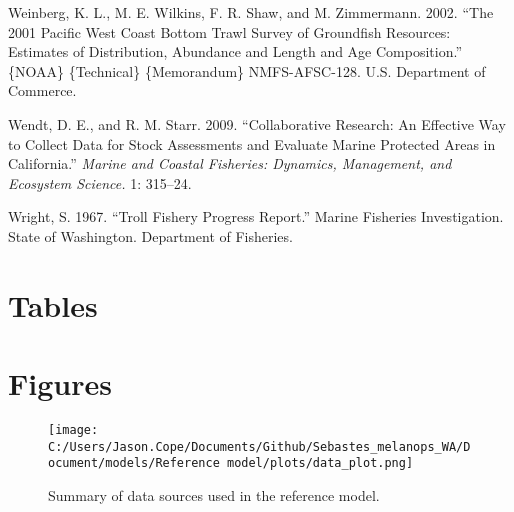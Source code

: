 \documentclass[11pt,
  english,
  letterpaper,
]{article}
\newlength{\cslhangindent}
\newenvironment{CSLReferences}[2] %
 {%
  \setlength{\parindent}{0pt}
  \ifodd #1 \everypar{\setlength{\hangindent}{\cslhangindent}}\ignorespaces\fi
  \ifnum #2 > 0
  \setlength{\parskip}{#2\baselineskip}
  \fi
 }%
 {}
\begin{document}
\begin{CSLReferences}{1}{0}
\leavevmode{}%
Weinberg, K. L., M. E. Wilkins, F. R. Shaw, and M. Zimmermann. 2002. {``The 2001 {Pacific} {West} {Coast} Bottom Trawl Survey of Groundfish Resources: Estimates of Distribution, Abundance and Length and Age Composition.''} \{NOAA\} \{Technical\} \{Memorandum\} NMFS-AFSC-128. U.S. Department of Commerce.

\leavevmode{}%
Wendt, D. E., and R. M. Starr. 2009. {``Collaborative Research: An Effective Way to Collect Data for Stock Assessments and Evaluate Marine Protected Areas in {C}alifornia.''} \emph{Marine and Coastal Fisheries: Dynamics, Management, and Ecosystem Science.} 1: 315--24.

\leavevmode{}%
Wright, S. 1967. {``Troll Fishery Progress Report.''} Marine Fisheries Investigation. State of Washington. Department of Fisheries.

\end{CSLReferences}

\clearpage

\hypertarget{tables}{%
\section{Tables}\label{tables}}

\clearpage

\hypertarget{figures}{%
\section{Figures}\label{figures}}

\begin{figure}
\centering
\texttt{[image: C:/Users/Jason.Cope/Documents/Github/Sebastes\_melanops\_WA/Document/models/Reference model/plots/data\_plot.png]}
\caption{Summary of data sources used in the reference model.\label{fig:data-plot}}
\end{figure}
\end{document}
